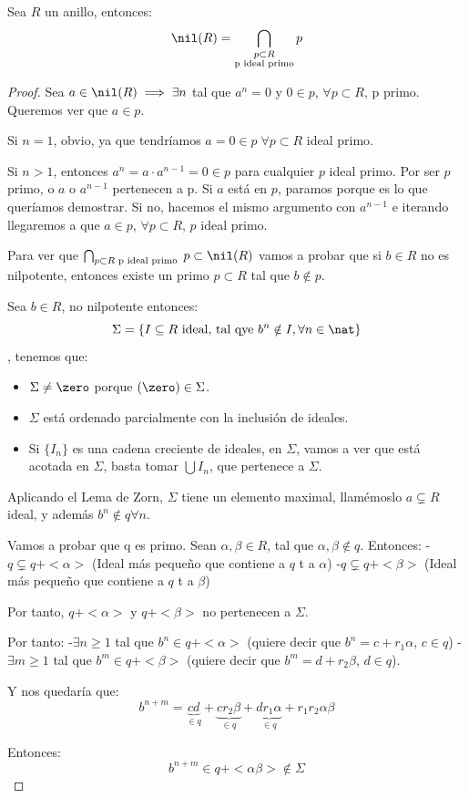 \begin{prop}
	Sea $R$ un anillo, entonces:
	$$ \nil(R)=\bigcap_{\substack{p\subset R\\\text{p ideal primo}}} p $$

\end{prop}
\begin{proof}

\proofpart{$\subset$}

	Sea $a \in \nil(R) \implies \exists n$ tal que $a^n=0$ y $0 \in p$, $\forall p \subset R$, p primo. Queremos ver que $a \in p$.

	Si $n=1$, obvio, ya que tendríamos $a=0\in p\; \forall p \subset R$ ideal primo.

	Si $n>1$, entonces $a^n = a\cdot a^{n-1}=0 \in p$ para cualquier $p$ ideal primo. Por ser $p$ primo, o $a$ o $a^{n-1}$ pertenecen a p. Si $a$ está en $p$, paramos porque es lo que queríamos demostrar. Si no, hacemos el mismo argumento con $a^{n-1}$ e iterando llegaremos a que $a \in p$, $\forall p \subset R$, $p$ ideal primo.

\proofpart{$\supset$}

	Para ver que $\bigcap_{p\subset R \text{ p ideal primo }}p \subset \nil(R)$ vamos a probar que si $b \in R$ no es nilpotente, entonces existe un primo $p\subset R$ tal que $b \notin p$.

	Sea $b \in R$, no nilpotente entonces:
	$$\Sigma = \{I \subseteq R \text{ ideal, tal qye }b^n \notin I, \forall n \in \nat\}$$, tenemos que:
	\begin{itemize}
	\item $\Sigma \neq \zero$ porque $(\zero) \in \Sigma$.
	\item $\Sigma$ está ordenado parcialmente con la inclusión de ideales.
	\item Si $\{I_n\}$ es una cadena creciente de ideales, en $\Sigma$, vamos a ver que está acotada en $\Sigma$, basta tomar $\bigcup I_n$, que pertenece a $\Sigma$.
	\end{itemize}

	Aplicando el Lema de Zorn, $\Sigma$ tiene un elemento maximal, llamémoslo $a \subsetneq R$ ideal, y además $b^n \notin q \forall n$.

	Vamos a probar que q es primo. Sean $\alpha, \beta \in R$, tal que $\alpha, \beta \notin q$. Entonces:
	-$q \subsetneq q + <\alpha>$ (Ideal más pequeño que contiene a $q$ t a $\alpha$)
	-$q \subsetneq q + <\beta>$ (Ideal más pequeño que contiene a $q$ t a $\beta$)

	Por tanto, $ q + <\alpha>$ y $q + <\beta>$ no pertenecen a $\Sigma$.

	Por tanto:
	-$\exists n\geq 1$ tal que $b^n \in q+<\alpha>$ (quiere decir que $b^n=c+r_1 \alpha$, $c\in q$)
	-$\exists m\geq 1$ tal que $b^m \in q+<\beta>$ (quiere decir que $b^m=d+r_2 \beta$, $d\in q$).

	Y nos quedaría que:
	$$b^{n+m}=\underbrace{cd}_{\in q}+\underbrace{cr_2\beta}_{\in q}+\underbrace{dr_1\alpha}_{\in q}+r_1r_2\alpha \beta$$

	Entonces:
	$$b^{n+m}\in q+<\alpha \beta> \notin \Sigma$$

\end{proof}

